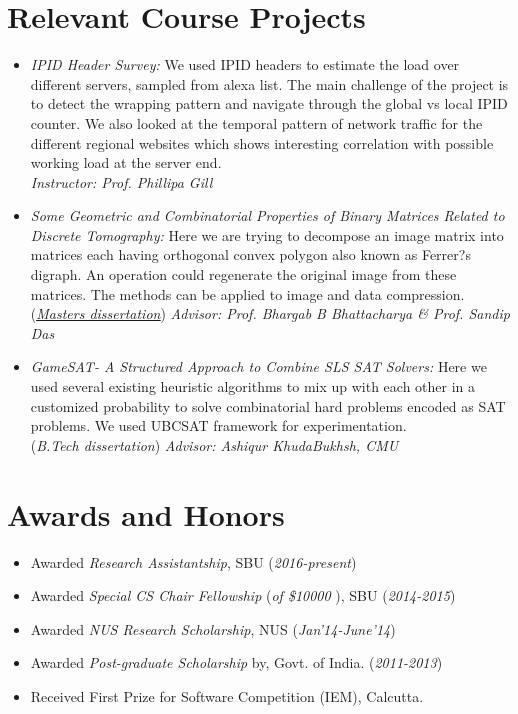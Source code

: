 \documentclass{res}
\begin{document}
\begin{resume}
\section{Relevant Course Projects}
\begin{itemize}

 \item{ \it{IPID Header Survey:}} We used IPID headers to estimate the load over different servers, sampled from alexa
 list. The main challenge of the project is to detect the wrapping pattern and navigate through the global vs local IPID counter. 
 We also looked at the temporal pattern of network traffic for the different regional websites which shows interesting correlation with possible 
 working load at the server end. \\
 {\it Instructor: Prof. Phillipa Gill}
 
 \item {{\it Some Geometric and Combinatorial Properties of Binary Matrices Related to
Discrete Tomography:}} Here we are trying to decompose an image matrix into matrices
each having orthogonal convex polygon also known as Ferrer?s digraph. An operation could
regenerate the original image from these matrices. The methods can be applied to image and
data compression. (\href{https://drive.google.com/open?id=0B3ErYrn4jOcxSHhReVF6cmROelE}{\it  \underline{Masters dissertation}}) 
{\it Advisor: Prof. Bhargab B Bhattacharya \& Prof. Sandip Das}

 \item 
 {{\it GameSAT- A Structured Approach to Combine SLS SAT Solvers:}} Here we used several existing heuristic algorithms to mix up with each other in a customized probability to solve combinatorial hard problems encoded as SAT problems. We used UBCSAT framework for experimentation. \\
({\it B.Tech dissertation}) {\it Advisor: Ashiqur KhudaBukhsh, CMU}
 
 \end{itemize}
 
 
\section{Awards and Honors}
   \begin{itemize}
   \item Awarded {\it Research Assistantship}, SBU ({\it 2016-present})
   \item Awarded {\it Special CS Chair Fellowship} ({\it of \$10000} ), SBU ({\it 2014-2015})
   \item Awarded {\it NUS Research Scholarship}, NUS ({\it Jan'14-June'14})
   \item Awarded {\it Post-graduate Scholarship} by, Govt. of India. ({\it 2011-2013}) 
   \item Received {\color{blue} First Prize} for Software Competition (IEM), Calcutta.
   \end{itemize}


\end{resume}
\end{document}
